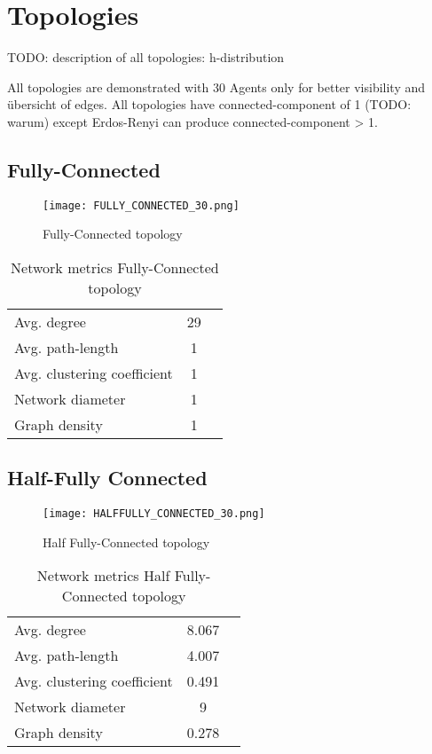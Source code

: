 \documentclass[Bachelorarbeit.tex]{subfiles}
\begin{document}
\graphicspath{{./figures/appendixTopologies/}}	%

\chapter{Topologies}
\label{app:topologies}
TODO: description of all topologies: h-distribution

All topologies are demonstrated with 30 Agents only for better visibility and übersicht of edges. 
All topologies have connected-component of 1 (TODO: warum) except Erdos-Renyi can produce connected-component > 1.

\section{Fully-Connected}

\begin{figure}[H]
	\centering
  \texttt{[image: FULLY\_CONNECTED\_30.png]}
	\caption{Fully-Connected topology}
	\label{fig:topology_FULLY_CONNECTED_30}
\end{figure}

\begin{table}[h]
	\centering
	\caption{Network metrics Fully-Connected topology}
	\begin{tabular} { l c r }
		\hline
		Avg. degree & 29 \\
		Avg. path-length & 1 \\
		Avg. clustering coefficient & 1 \\
		Network diameter & 1 \\
		Graph density & 1 \\
		\hline
	\end{tabular}
\end{table}

\section{Half-Fully Connected}
\begin{figure}[H]
	\centering
  \texttt{[image: HALFFULLY\_CONNECTED\_30.png]}
	\caption{Half Fully-Connected topology}
	\label{fig:topology_HALFFULLY_CONNECTED_30}
\end{figure}

\begin{table}[h]
	\centering
	\caption{Network metrics Half Fully-Connected topology}
	\begin{tabular} { l c r }
		\hline
		Avg. degree & 8.067 \\
		Avg. path-length & 4.007 \\
		Avg. clustering coefficient & 0.491 \\
		Network diameter & 9 \\
		Graph density & 0.278 \\
		\hline
	\end{tabular}
\end{table}
\end{document}
